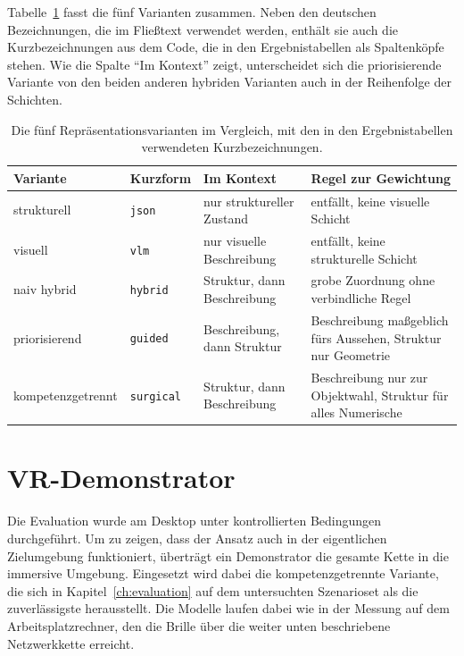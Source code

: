 Tabelle~\ref{tab:variants} fasst die fünf Varianten zusammen.
Neben den deutschen Bezeichnungen, die im Fließtext verwendet werden, enthält sie auch die Kurzbezeichnungen aus dem Code, die in den Ergebnistabellen als Spaltenköpfe stehen.
Wie die Spalte \enquote{Im Kontext} zeigt, unterscheidet sich die priorisierende Variante von den beiden anderen hybriden Varianten auch in der Reihenfolge der Schichten.

\begin{table}[htbp]
  \centering
  \caption{Die fünf Repräsentationsvarianten im Vergleich, mit den in den Ergebnistabellen verwendeten Kurzbezeichnungen.}
  \label{tab:variants}
  \small
  \setlength{\tabcolsep}{5pt}
  \renewcommand{\arraystretch}{1.3}
  \begin{tabular}{@{}p{3.0cm} l p{3.3cm} p{4.6cm}@{}}
    \toprule
    Variante & Kurzform & Im Kontext & Regel zur Gewichtung \\
    \midrule
    strukturell & \texttt{json} & nur struktureller Zustand & entfällt, keine visuelle Schicht \\
    visuell & \texttt{vlm} & nur visuelle Beschreibung & entfällt, keine strukturelle Schicht \\
    naiv hybrid & \texttt{hybrid} & Struktur, dann Beschreibung & grobe Zuordnung ohne verbindliche Regel \\
    priorisierend & \texttt{guided} & Beschreibung, dann Struktur & Beschreibung maßgeblich fürs Aussehen, Struktur nur Geometrie \\
    kompetenzgetrennt & \texttt{surgical} & Struktur, dann Beschreibung & Beschreibung nur zur Objektwahl, Struktur für alles Numerische \\
    \bottomrule
  \end{tabular}
\end{table}


\section{VR-Demonstrator}
\label{sec:impl-demonstrator}

Die Evaluation wurde am Desktop unter kontrollierten Bedingungen durchgeführt.
Um zu zeigen, dass der Ansatz auch in der eigentlichen Zielumgebung funktioniert, überträgt ein Demonstrator die gesamte Kette in die immersive Umgebung.
Eingesetzt wird dabei die kompetenzgetrennte Variante, die sich in Kapitel~\ref{ch:evaluation} auf dem untersuchten Szenarioset als die zuverlässigste herausstellt.
Die Modelle laufen dabei wie in der Messung auf dem Arbeitsplatzrechner, den die Brille über die weiter unten beschriebene Netzwerkkette erreicht.

